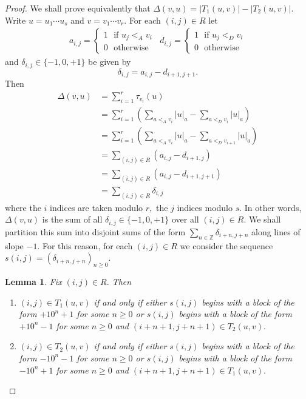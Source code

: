 \documentclass[12pt,a4paper]{amsart}
\newcommand{\ints}{{\mathbb Z}}
\newtheorem{lemma}{Lemma}
\begin{document}
\begin{proof} We shall prove equivalently that $\Delta(v,u)=|T_1(u,v)|-|T_2(u,v)|.$ 
Write $u=u_1\cdots u_s$ and $v=v_1\cdots v_r.$ For each $(i,j)\in R$ let 
\begin{align}a_{i,j}= \begin{cases} 1\,\,\,\, \text{if  $u_j<_A v_i$}\\ 0\,\,\,\, \text{otherwise} \end{cases}
\,\,\,d_{i,j}= \begin{cases} 1\,\,\,\, \text{if  $u_j<_D v_i$}\\ 0\,\,\,\, \text{otherwise} \end{cases}
\end{align}
and $\delta_{i,j} \in \{-1,0,+1\}$ be given by \[\delta_{i,j}=a_{i,j} - d_{i+1,j+1}.\]
Then
\begin{align*}
\Delta(v,u) & =\sum _{i=1}^r \tau_{v_i}(u) \\
&= \sum_{i=1}^r (\sum_{a<_A v_i}|u|_a -\sum_{a<_D v_i}|u|_a)\\
&= \sum_{i=1}^r (\sum_{a<_A v_i}|u|_a -\sum_{a<_D v_{i+1}}|u|_a)\\
&= \sum_{(i,j)\in R} (a_{i,j} - d_{i+1,j})\\
&=  \sum_{(i,j)\in R} (a_{i,j} - d_{i+1,j+1})\\
&=  \sum_{(i,j)\in R} \delta_{i,j}
\end{align*}
where the $i$ indices are taken modulo $r,$ the $j$ indices modulo $s.$ In other words, $\Delta(v,u)$ is the sum of all 
$\delta_{i,j}\in \{-1,0,+1\}$ over all $(i,j)\in R.$ We shall partition this sum into disjoint sums of the form $\sum _{n\in \ints} \delta_{i+n,j+n}$ along lines of slope $-1.$  For this reason, for each $(i,j)\in R$ we consider the  sequence $s(i,j)=(\delta_{i+n,j+n})_{n\geq 0}.$ \\

\begin{lemma}\label{code}Fix $(i,j)\in R.$  Then
\begin{enumerate}
\item $(i,j)\in T_1(u,v)$ if and only if either $s(i,j)$ begins with a block of the form $+10^n+1$ for some $n\geq 0$ or $s(i,j)$ begins with a block of the form
 $+10^n-1$ for some $n\geq 0$ and $(i+n+1,j+n+1)\in T_2(u,v).$
\item $(i,j)\in T_2(u,v)$ if and only if either $s(i,j)$ begins with a block of the form $-10^n-1$ for some $n\geq 0$ or $s(i,j)$ begins with a block of the form
 $-10^n+1$ for some $n\geq 0$ and $(i+n+1,j+n+1)\in T_1(u,v).$
\end{enumerate}
\end{lemma}


\end{proof}
\end{document}
